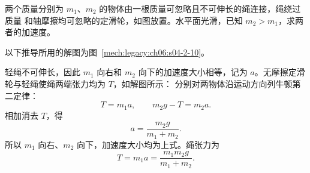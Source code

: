 {\begin{origexamplebox}{}\label{ch06:ex:s04-2-10}
两个质量分别为 $m_1$、$m_2$ 的物体由一根质量可忽略且不可伸长的绳连接，绳绕过质量
和轴摩擦均可忽略的定滑轮，如图放置。水平面光滑，已知 $m_2>m_1$，求两者的加速度。

\begin{center}\begin{minipage}{\linewidth}\centering
{}
\end{minipage}\end{center}
\label{ch06:fig:s04-2-10}
\end{origexamplebox}

\begin{xesolution}
以下推导所用的解图为图~\ref{mech:legacy:ch06:s04-2-10}。

轻绳不可伸长，因此 $m_1$ 向右和 $m_2$ 向下的加速度大小相等，记为 $a$。无摩擦定滑轮与轻绳使绳两端张力均为 $T$，如解图所示：
\soldiagTwoTen
分别对两物体沿运动方向列牛顿第二定律：
\[
  T=m_1a,
  \qquad
  m_2g-T=m_2a.
\]
相加消去 $T$，得
\[
  \boxed{a=\frac{m_2g}{m_1+m_2}}.
\]
所以 $m_1$ 向右、$m_2$ 向下，加速度大小均为上式。绳张力为
\[
  T=m_1a=\frac{m_1m_2g}{m_1+m_2}.
\]
\end{xesolution}
}

